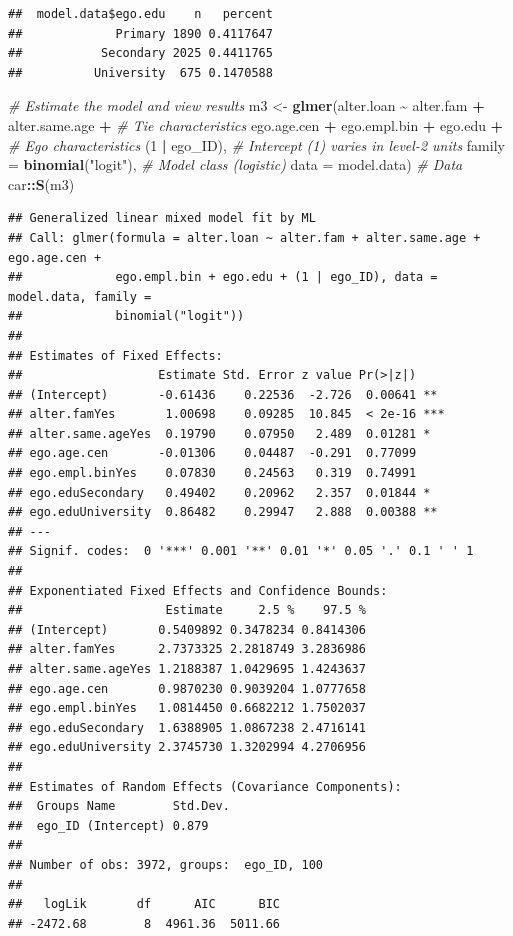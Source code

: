 \documentclass[
]{book}
\newenvironment{Shaded}{\begin{snugshade}}{\end{snugshade}}
\newcommand{\AttributeTok}[1]{\textcolor[rgb]{0.13,0.29,0.53}{#1}}
\newcommand{\CommentTok}[1]{\textcolor[rgb]{0.56,0.35,0.01}{\textit{#1}}}
\newcommand{\DecValTok}[1]{\textcolor[rgb]{0.00,0.00,0.81}{#1}}
\newcommand{\FunctionTok}[1]{\textcolor[rgb]{0.13,0.29,0.53}{\textbf{#1}}}
\newcommand{\NormalTok}[1]{#1}
\newcommand{\OtherTok}[1]{\textcolor[rgb]{0.56,0.35,0.01}{#1}}
\newcommand{\SpecialCharTok}[1]{\textcolor[rgb]{0.81,0.36,0.00}{\textbf{#1}}}
\newcommand{\StringTok}[1]{\textcolor[rgb]{0.31,0.60,0.02}{#1}}
\begin{document}
\begin{verbatim}
##  model.data$ego.edu    n   percent
##             Primary 1890 0.4117647
##           Secondary 2025 0.4411765
##          University  675 0.1470588
\end{verbatim}

\begin{Shaded}
\begin{Highlighting}[]
\CommentTok{\# Estimate the model and view results}
\NormalTok{m3 }\OtherTok{\textless{}{-}} \FunctionTok{glmer}\NormalTok{(alter.loan }\SpecialCharTok{\textasciitilde{}}\NormalTok{ alter.fam }\SpecialCharTok{+}\NormalTok{ alter.same.age }\SpecialCharTok{+} \CommentTok{\# Tie characteristics}
\NormalTok{              ego.age.cen }\SpecialCharTok{+}\NormalTok{ ego.empl.bin }\SpecialCharTok{+}\NormalTok{ ego.edu }\SpecialCharTok{+} \CommentTok{\# Ego characteristics}
\NormalTok{              (}\DecValTok{1} \SpecialCharTok{|}\NormalTok{ ego\_ID), }\CommentTok{\# Intercept (1) varies in level{-}2 units}
            \AttributeTok{family =} \FunctionTok{binomial}\NormalTok{(}\StringTok{"logit"}\NormalTok{), }\CommentTok{\# Model class (logistic)}
            \AttributeTok{data =}\NormalTok{ model.data) }\CommentTok{\# Data}
\NormalTok{car}\SpecialCharTok{::}\FunctionTok{S}\NormalTok{(m3)}
\end{Highlighting}
\end{Shaded}

\begin{verbatim}
## Generalized linear mixed model fit by ML
## Call: glmer(formula = alter.loan ~ alter.fam + alter.same.age + ego.age.cen +
##             ego.empl.bin + ego.edu + (1 | ego_ID), data = model.data, family =
##             binomial("logit"))
## 
## Estimates of Fixed Effects:
##                   Estimate Std. Error z value Pr(>|z|)    
## (Intercept)       -0.61436    0.22536  -2.726  0.00641 ** 
## alter.famYes       1.00698    0.09285  10.845  < 2e-16 ***
## alter.same.ageYes  0.19790    0.07950   2.489  0.01281 *  
## ego.age.cen       -0.01306    0.04487  -0.291  0.77099    
## ego.empl.binYes    0.07830    0.24563   0.319  0.74991    
## ego.eduSecondary   0.49402    0.20962   2.357  0.01844 *  
## ego.eduUniversity  0.86482    0.29947   2.888  0.00388 ** 
## ---
## Signif. codes:  0 '***' 0.001 '**' 0.01 '*' 0.05 '.' 0.1 ' ' 1
## 
## Exponentiated Fixed Effects and Confidence Bounds:
##                    Estimate     2.5 %    97.5 %
## (Intercept)       0.5409892 0.3478234 0.8414306
## alter.famYes      2.7373325 2.2818749 3.2836986
## alter.same.ageYes 1.2188387 1.0429695 1.4243637
## ego.age.cen       0.9870230 0.9039204 1.0777658
## ego.empl.binYes   1.0814450 0.6682212 1.7502037
## ego.eduSecondary  1.6388905 1.0867238 2.4716141
## ego.eduUniversity 2.3745730 1.3202994 4.2706956
## 
## Estimates of Random Effects (Covariance Components):
##  Groups Name        Std.Dev.
##  ego_ID (Intercept) 0.879   
## 
## Number of obs: 3972, groups:  ego_ID, 100
## 
##   logLik       df      AIC      BIC 
## -2472.68        8  4961.36  5011.66
\end{verbatim}
\end{document}
